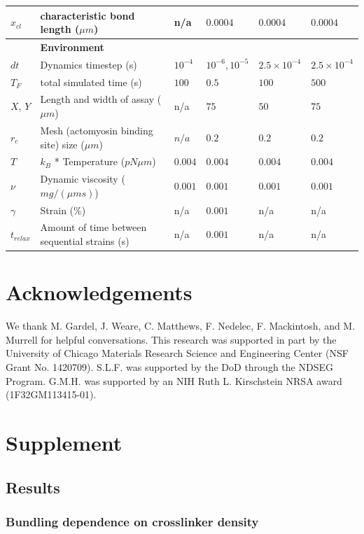 \documentclass[12pt]{article}
\newcommand{\beginsupplement}{%
  \setcounter{table}{0}
  \renewcommand{\thetable}{S\arabic{table}}%
  \setcounter{figure}{0}
  \renewcommand{\thefigure}{S\arabic{figure}}%
}
\begin{document}
\begin{table}
\begin{tabular}{|C{1cm}|L{6cm}|C{2cm}|C{2cm}|C{2cm}|C{2cm}|}
    $x_{cl}$& characteristic bond length ($\mu m$) & n/a & $0.0004$ & $0.0004$ & $0.0004$ \\
    \hline
    &\bf{Environment} & & \\
    \hline
    $dt$ & Dynamics timestep (s) & $10^{-4}$ & $10^{-6},10^{-5}$ &$2.5\times10^{-4}$ &$2.5\times10^{-4}$ \\
    $T_F$& total simulated time (s) & $100$ & $0.5$ & $100$ & $500$ \\
    $X$, $Y$ & Length and width of assay ($\mu m$)& n/a & $75$ & $50$ & $75$\\
    $r_c$ & Mesh (actomyosin binding site) size ($\mu m$) & $n/a$ & $0.2 $ & $0.2 $& $0.2 $ \\ 
    $T$ & $k_B$ * Temperature ($pN\mu m$)& $0.004$ & $0.004$& $0.004$& $0.004$\\
    $\nu$ & Dynamic viscosity ($mg/(\mu m s)$) & $0.001$& $0.001$& $0.001$& $0.001$\\
    $\gamma$ & Strain (\%) \cite{stricker2010}& n/a& $0.001$&n/a&n/a\\
    $t_{relax}$ & Amount of time between sequential strains (s)& n/a& $0.001$ &n/a&n/a\\
    \hline
  \end{tabular}
  \label{tab:params}
\end{table}

\section{Acknowledgements}  
We thank M. Gardel, J. Weare, C. Matthews, F. Nedelec, F. Mackintosh, and M.
Murrell for helpful conversations. This research was supported in part by the
University of Chicago Materials Research Science and Engineering Center
(NSF Grant No. 1420709). S.L.F. was supported by the DoD
through the NDSEG Program. G.M.H. was supported by an NIH Ruth L. Kirschstein
NRSA award (1F32GM113415-01).


\beginsupplement
\section{Supplement}
\subsection{Results}
\subsubsection{Bundling dependence on crosslinker density}
\end{document}
